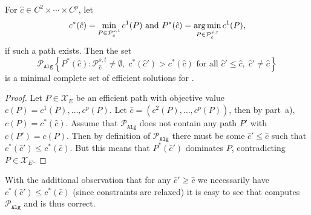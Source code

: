 \documentclass[11pt,english,a4paper,parskip=half-]{scrartcl}
\begin{document}
\begin{solution}
\begin{enumerate}
	\begin{lemma}
	For $\hat c \in C^2 \times \dotsm \times C^p$, let
	\[c^*(\hat c) = \min_{P \in \mathcal P^{s,t}_{\hat c}} c^1(P)\text{ and }
	P^*(\hat c) = \operatorname*{arg\,min}_{P \in \mathcal P^{s,t}_{\hat c}} c^1(P)\text{,}\]
	if such a path exists. Then the set \[ \mathcal P_{\mathtt{Alg}}\left\{P^*(\hat c):  
	\mathcal P^{s,t}_{\hat c} \neq \emptyset,\; c^*(\hat c') > c^*(\hat c)\text{ for all }
	\hat c' \leq \hat c,\; \hat c' \neq \hat c\right\}\]
	is a minimal complete set of efficient solutions for .
	\end{lemma}
	\begin{proof}
	Let $P \in \mathcal X_E$ be an efficient path with objective value
	$c(P) = c^1(P), \dotsc, c^p(P)$. Let $\hat c = (c^2(P), \dotsc, c^p(P))$, then
	by part~a), $c(P) = c^*(\hat c)$. Assume that $\mathcal P_{\mathtt{Alg}}$ does
	not contain any path $P'$ with $c(P') = c(P)$. Then by definition of
	$\mathcal P_{\mathtt{Alg}}$ there must be some $\hat c' \leq \hat c$
	such that $c^*(\hat c') \leq c^*(\hat c)$. But this means that $P^*(\hat c')$ 
	dominates $P$, contradicting $P \in \mathcal X_E$.
	\end{proof}
	With the additional observation that for any $\hat c' \geq \hat c$ we necessarily have $c^*(\hat c') \leq  c^*(\hat c)$ (since constraints are relaxed)
	it is easy to see that  computes $\mathcal P_{\mathtt{Alg}}$ and is thus correct.
	

\end{enumerate}
\end{solution}
\end{document}
